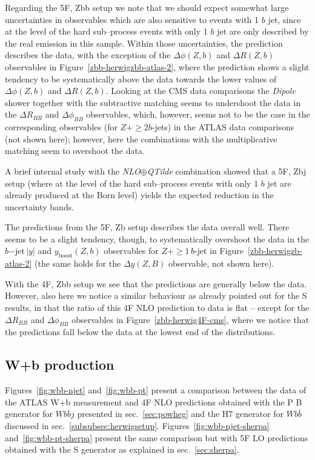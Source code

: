 \documentclass[11pt]{cernrep}
\newcommand{\Sherpa}{S\protect\scalebox{0.8}{HERPA}\xspace}
\newcommand{\Herwig}{H\protect\scalebox{0.8}{ERWIG}7\xspace}
\newcommand{\POWHEGBOX}{P\protect\scalebox{0.8}{OWHEG} B\protect\scalebox{0.8}{OX}\xspace}
\begin{document}
Regarding the 5F, Zbb setup we note that we should expect somewhat large
uncertainties in observables which are also sensitive to events with 1 $b$ jet,
since at the level of the hard sub--process events with only 1 $b$ jet are only
described by the real emission in this sample. Within those uncertainties, the
prediction describes the data, with the exception of the $\Delta \phi(Z,b)$ and
$\Delta R(Z,b)$ observables in Figure~\ref{zbb-herwigzbb-atlas-2}, where the
prediction shows a slight tendency to be systematically above the data towards
the lower values of $\Delta \phi(Z,b)$ and $\Delta R(Z,b)$. Looking at the CMS
data comparisons the \textit{Dipole} shower together with the subtractive matching
seems to undershoot the data in the
$\Delta R_{BB}$ and $\Delta \phi_{BB}$ observables, which, however, seems not to
be the case in the corresponding observables (for $Z+\geq2b$-jets) in the ATLAS
data comparisons (not shown here); however, here the combinations with the
multiplicative matching seem to overshoot the data.

A brief internal study with the \textit{NLO}$\oplus$\textit{QTilde} combination
showed that a 5F, Zbj setup (where at the level of the hard sub--process events
with only 1 $b$ jet are already produced at the Born level) yields the expected
reduction in the uncertainty bands.

The predictions from the 5F, Zb setup describes the data overall well. There
seems to be a slight tendency, though, to systematically overshoot the data in
the $b\mathrm{-jet}\,|y|$ and $y_{\mathrm{boost}}(Z,b)$ observables for
$Z+\geq 1\,b$-jet in Figure~\ref{zbb-herwigzb-atlas-2} (the same holds for the
$\Delta y(Z,B)$ observable, not shown here).

With the 4F, Zbb setup we see that the predictions are generally below the
data. However, also here we notice a similar behaviour as already pointed out
for the \Sherpa results, in that the ratio of this 4F NLO prediction to data is
flat -- except for the $\Delta R_{BB}$ and $\Delta \phi_{BB}$ observables in
Figure~\ref{zbb-herwig4F-cms}, where we notice that the predictions fall below
the data at the lowest end of the distributions.

\subsection{W+b production \label{Wbb}}

Figures~\ref{fig:wbb-njet} and~\ref{fig:wbb-pt} present a comparison
between the data of the ATLAS W+b measurement and 4F NLO predictions obtained
with the \POWHEGBOX{} generator for $Wb\bar{b}j$ presented in
sec.~\ref{sec:powheg} and the \Herwig generator for $Wb\bar{b}$
discussed in sec.~\ref{subsubsec:herwigsetup}. Figures~\ref{fig:wbb-njet-sherpa} and~\ref{fig:wbb-pt-sherpa} present the same comparison but
with 5F LO predictions obtained with the \Sherpa generator as explained in sec.~\ref{sec:sherpa}.
\end{document}

